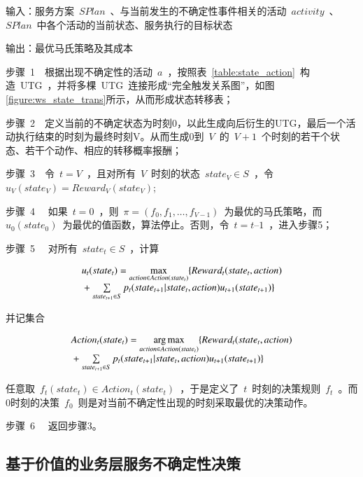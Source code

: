 输入：服务方案~$SPlan$~、与当前发生的不确定性事件相关的活动~$activity$~、
~$SPlan$~中各个活动的当前状态、服务执行的目标状态

输出：最优马氏策略及其成本

步骤~1~~根据出现不确定性的活动~$a$~，按照表~\ref{table:state_action}~构造~UTG~，并将多棵~UTG~连接形成“完全触发关系图”，如图\ref{figure:ws_state_trans}所示，从而形成状态转移表；

步骤~2~~定义当前的不确定状态为时刻0，以此生成向后衍生的UTG，最后一个活动执行结束的时刻为最终时刻V。从而生成0到~$V$~的~$V+1$~个时刻的若干个状态、若干个动作、相应的转移概率报酬；

步骤~3~~令~$t=V$~，且对所有~$V$~时刻的状态~$state_V \in S$~，令~${u_V}( {state_V} ) = Reward_V( {state_V} )$;

步骤~4~~ 如果~$t=0$~，则~$\pi  = (f_0,f_1,\ldots ,f_{V-1})$~为最优的马氏策略，而~${u_0}( state_0)$~为最优的值函数，算法停止。否则，令~$t=t–1$~，进入步骤5；

步骤~5~~ 对所有~$state_t \in S$~，计算

\begin{equation}\label{equation:backward_mdp}
\begin{array}{l}
{u_t}(stat{e_t}) = \mathop {\max }\limits_{action \in Action(stat{e_t})} \{ Rewar{d_t}(stat{e_t},action)\\
{\rm{                        }} + \sum\limits_{stat{e_{t + 1}} \in S} {{p_t}(stat{e_{t + 1}}|stat{e_t},action){u_{t + 1}}(stat{e_{t + 1}})} \} 
\end{array}
\end{equation}

并记集合

\begin{equation}\label{equation:backward_mdp_arg}
\begin{array}{l}
Actio{n_t}(stat{e_t}) = \mathop {\arg \max }\limits_{action \in Action(stat{e_t})} \{ Rewar{d_t}(stat{e_t},action)\\
{\rm{                       }} + \sum\limits_{stat{e_{t + 1}} \in S} {{p_t}(stat{e_{t + 1}}|stat{e_t},action){u_{t + 1}}(stat{e_{t + 1}})} \} 
\end{array}
\end{equation}

任意取~$f_t(state_t) \in Action_t(state_t)$~，于是定义了~$t$~时刻的决策规则~$f_t$~。而0时刻的决策~$f_0$~则是对当前不确定性出现的时刻采取最优的决策动作。

步骤~6~~ 返回步骤3。

\subsection{基于价值的业务层服务不确定性决策}

